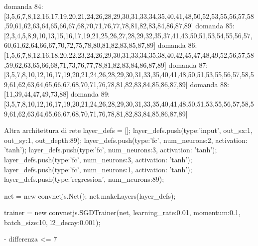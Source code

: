 domanda 84:[3,5,6,7,8,12,16,17,19,20,21,24,26,28,29,30,31,33,34,35,40,41,48,50,52,53,55,56,57,58,59,61,62,63,64,65,66,67,68,70,71,76,77,78,81,82,83,84,86,87,89]
domanda 85:[2,3,4,5,8,9,10,13,15,16,17,19,21,25,26,27,28,29,32,35,37,41,43,50,51,53,54,55,56,57,60,61,62,64,66,67,70,72,75,78,80,81,82,83,85,87,89]
domanda 86:[1,5,6,7,8,12,16,18,20,22,23,24,26,29,30,31,33,34,35,38,40,42,45,47,48,49,52,56,57,58,59,62,63,65,66,68,71,73,76,77,78,81,82,83,84,86,87,89]
domanda 87:[3,5,7,8,10,12,16,17,19,20,21,24,26,28,29,30,31,33,35,40,41,48,50,51,53,55,56,57,58,59,61,62,63,64,65,66,67,68,70,71,76,78,81,82,83,84,85,86,87,89]
domanda 88:[11,39,44,47,49,73,88]
domanda 89:[3,5,7,8,10,12,16,17,19,20,21,24,26,28,29,30,31,33,35,40,41,48,50,51,53,55,56,57,58,59,61,62,63,64,65,66,67,68,70,71,76,78,81,82,83,84,85,86,87,89]

Altra architettura di rete
layer_defs = [];
layer_defs.push({type:'input', out_sx:1, out_sy:1, out_depth:89});
layer_defs.push({type:'fc', num_neurons:2, activation: 'tanh'});
layer_defs.push({type:'fc', num_neurons:3, activation: 'tanh'});
layer_defs.push({type:'fc', num_neurons:3, activation: 'tanh'});
layer_defs.push({type:'fc', num_neurons:1, activation: 'tanh'});
layer_defs.push({type:'regression', num_neurons:89});

net = new convnetjs.Net();
net.makeLayers(layer_defs);

trainer = new convnetjs.SGDTrainer(net, {learning_rate:0.01, momentum:0.1, batch_size:10, l2_decay:0.001});

- differenza <= 7

